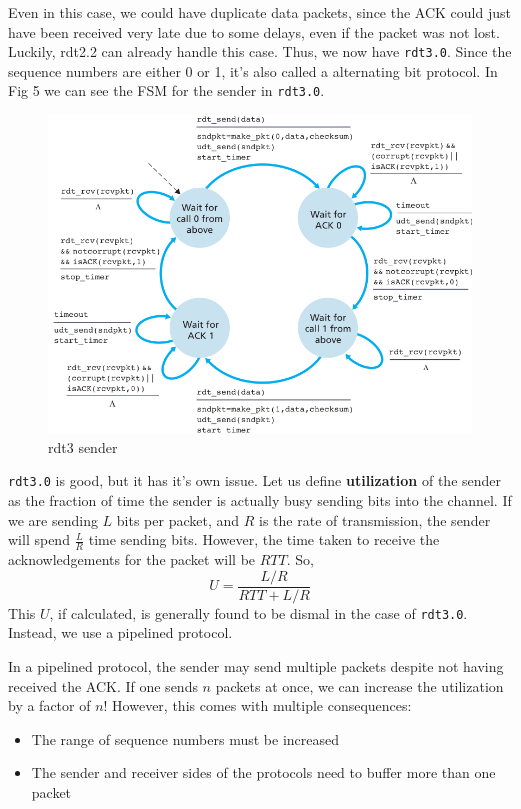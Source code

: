\documentclass[12pt,letterpaper]{article}
\theoremstyle{definition}
\begin{document}
Even in this case, we could have duplicate data packets, since the ACK could just have been received very late due to some delays, even if the packet was not lost. Luckily, rdt2.2 can already handle this case. Thus, we now have \texttt{rdt3.0}. Since the sequence numbers are either 0 or 1, it's also called a alternating bit protocol. In Fig 5 we can see the FSM for the sender in \texttt{rdt3.0}.

\begin{figure}[htpb]
  \centering
  \includegraphics[width=0.8\linewidth]{./assets/rdt3_fsm.png}
  \caption{rdt3 sender}%
  \label{fig:./assets}
\end{figure}

\texttt{rdt3.0} is good, but it has it's own issue. Let us define \textbf{utilization} of the sender as the fraction of time the sender is actually busy sending bits into the channel. If we are sending $L$ bits per packet, and $R$ is the rate of transmission, the sender will spend $\frac{L}{R}$ time sending bits. However, the time taken to receive the acknowledgements for the packet will be $RTT$. So,
\[U = \frac{L/R}{RTT+L/R}\]
This $U$, if calculated, is generally found to be dismal in the case of \texttt{rdt3.0}. Instead, we use a pipelined protocol.

In a pipelined protocol, the sender may send multiple packets despite not having received the ACK. If one sends $n$ packets at once, we can increase the utilization by a factor of $n$! However, this comes with multiple consequences:

\begin{itemize}
  \item The range of sequence numbers must be increased
  \item The sender and receiver sides of the protocols need to buffer more than one packet
\end{itemize}
\end{document}
